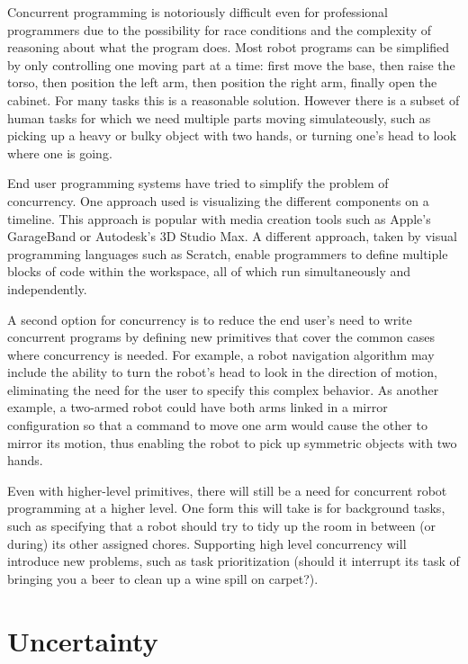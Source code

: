 \documentclass{article}
\begin{document}
Concurrent programming is notoriously difficult even for professional programmers due to the possibility for race conditions and the complexity of reasoning about what the program does. Most robot programs can be simplified by only controlling one moving part at a time: first move the base, then raise the torso, then position the left arm, then position the right arm, finally open the cabinet. For many tasks this is a reasonable solution. However there is a subset of human tasks for which we need multiple parts moving simulateously, such as picking up a heavy or bulky object with two hands, or turning one's head to look where one is going.

End user programming systems have tried to simplify the problem of concurrency. One approach used is visualizing the different components on a timeline. This approach is popular with media creation tools such as Apple's GarageBand or Autodesk's 3D Studio Max. A different approach, taken by visual programming languages such as Scratch, enable programmers to define multiple blocks of code within the workspace, all of which run simultaneously and independently.

A second option for concurrency is to reduce the end user's need to write concurrent programs by defining new primitives that cover the common cases where concurrency is needed.  For example, a robot navigation algorithm may include the ability to turn the robot's head to look in the direction of motion, eliminating the need for the user to specify this complex behavior.  As another example, a two-armed robot could have both arms linked in a mirror configuration so that a command to move one arm would cause the other to mirror its motion, thus enabling the robot to pick up symmetric objects with two hands.

Even with higher-level primitives, there will still be a need for concurrent robot programming at a higher level. One form this will take is for background tasks, such as specifying that a robot should try to tidy up the room in between (or during) its other assigned chores. Supporting high level concurrency will introduce new problems, such as task prioritization (should it interrupt its task of bringing you a beer to clean up a wine spill on carpet?).

\section{Uncertainty}

\end{document}
